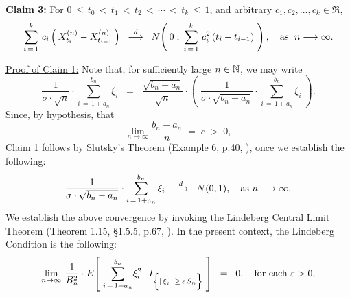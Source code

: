 \begin{enumerate}
		\vskip 0.5cm
		\begin{center}
		\begin{minipage}{6.0in}
		\noindent
		\textbf{Claim 3:}\quad
		For $0 \,\leq\, t_{0} \,<\, t_{1} \,<\, t_{2} \,<\, \cdots \,<\, t_{k} \,\leq\, 1$,
		and arbitrary $c_{1}, c_{2}, \ldots, c_{k} \in \Re$,
		\begin{equation*}
		\sum_{i\,=\,1}^{k}\,c_{i}\left(\,X^{(n)}_{t_{i}} - X^{(n)}_{t_{i-1}}\,\right)
		\;\; \overset{d}{\longrightarrow} \;\;
		N\!\left(\,0\;,\;\sum_{i\,=\,1}^{k}\,c_{i}^{2}\,(t_{i} - t_{i-1})\;\right),
		\quad
		\textnormal{as \;$n \longrightarrow\infty$}.
		\end{equation*}
		\end{minipage}
		\end{center}

		\vskip 0.5cm
		\noindent
		\underline{Proof of Claim 1:}\quad
		Note that, for sufficiently large $n \in \mathbb{N}$, we may write
		\begin{equation*}
		\dfrac{1}{\sigma\cdot\sqrt{n}} \cdot \sum_{i\,=\,1+a_{n}}^{b_{n}}\xi_{i}
		\;\; = \;\;
		\dfrac{\sqrt{b_{n} - a_{n}}}{\sqrt{n}}\cdot
		\left(\;\dfrac{1}{\sigma\cdot\sqrt{b_{n} - a_{n}}} \cdot \sum_{i\,=\,1+a_{n}}^{b_{n}}\xi_{i}\;\right).
		\end{equation*}
		Since, by hypothesis, that
		\begin{equation*}
		\lim_{n\rightarrow\infty}\dfrac{b_{n} - a_{n}}{n} \;=\; c \;>\; 0,
		\end{equation*}
		Claim 1 follows by Slutsky's Theorem (Example 6, p.40, \cite{Ferguson1996}),
		once we establish the following:
		\begin{equation*}
		\dfrac{1}{\sigma\cdot\sqrt{b_{n} - a_{n}}} \cdot \sum_{i\,=\,1+a_{n}}^{b_{n}}\xi_{i}
		\;\; \overset{d}{\longrightarrow} \;\; N(0,1),
		\quad
		\textnormal{as $n \longrightarrow \infty$}.
		\end{equation*}
		We establish the above convergence by invoking
		the Lindeberg Central Limit Theorem (Theorem 1.15, \S1.5.5, p.67, \cite{Shao2003}).
		In the present context, the Lindeberg Condition is the following:
		\begin{eqnarray*}
		\lim_{n\rightarrow\infty}\,
		\dfrac{1}{B_{n}^{2}}\cdot
		E\!\left[\;
		\underset{i\,=\,1+a_{n}}{\overset{b_{n}}{\sum}}\xi_{i}^{2}
		\cdot
		I_{\left\{\vert\,\overset{{\color{white}.}}{\xi}_{i}\,\vert\,\geq\,\varepsilon\,S_{n}\right\}}
		\;\right]
		\;\; = \;\; 0,
		\quad
		\textnormal{for each $\varepsilon > 0$},
		\end{eqnarray*}

\end{enumerate}
